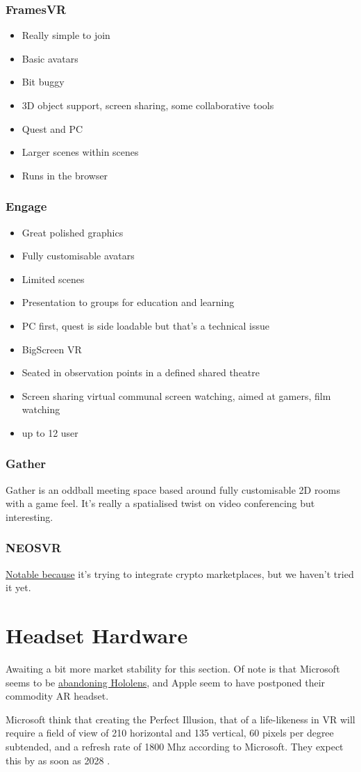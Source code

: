 \subsubsection{FramesVR}
\begin{itemize}
\item Really simple to join
\item Basic avatars
\item Bit buggy
\item 3D object support, screen sharing, some collaborative tools
\item Quest and PC
\item Larger scenes within scenes
\item Runs in the browser
\end{itemize}
\subsubsection{Engage}
\begin{itemize}
\item Great polished graphics
\item Fully customisable avatars
\item Limited scenes
\item Presentation to groups for education and learning
\item PC first, quest is side loadable but that's a technical issue
\item BigScreen VR
\item Seated in observation points in a defined shared theatre
\item Screen sharing virtual communal screen watching, aimed at gamers, film watching
\item up to 12 user
\end{itemize}
\subsubsection{Gather}
Gather is an oddball meeting space based around fully customisable 2D rooms with a game feel. It's really a spatialised twist on video conferencing but interesting.  
\subsubsection{NEOSVR}
\href{https://neos.com/}{Notable because} it's trying to integrate crypto marketplaces, but we haven't tried it yet.
\section{Headset Hardware}
Awaiting a bit more market stability for this section. Of note is that Microsoft seems to be \href{https://www.windowscentral.com/microsoft/microsoft-has-laid-off-entire-teams-behind-virtual-mixed-reality-and-hololens}{abandoning Hololens}, and Apple seem to have postponed their commodity AR headset. \par
Microsoft think that creating the Perfect Illusion, that of a life-likeness in VR will require a field of view of 210 horizontal and  135 vertical, 60 pixels per degree subtended, and a refresh rate of 1800 Mhz according to Microsoft. They expect this by as soon as 2028 \cite{cuervo2018creating}.
